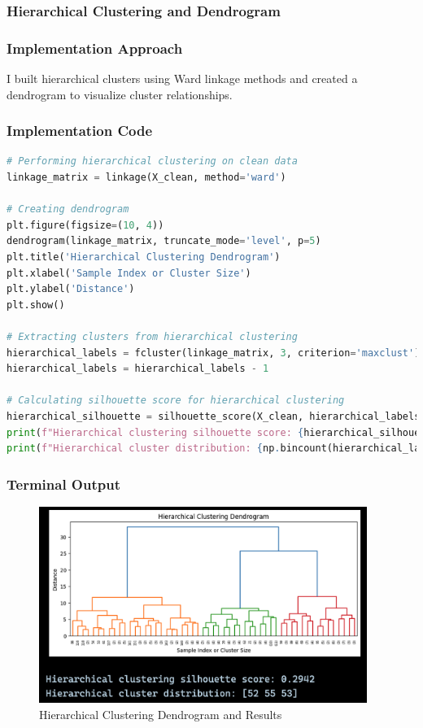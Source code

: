 \documentclass[12pt,a4paper]{article}
\begin{document}
\subsubsection{Hierarchical Clustering and Dendrogram}

\subsubsection{Implementation Approach}
I built hierarchical clusters using Ward linkage methods and created a dendrogram to visualize cluster relationships.

\subsubsection{Implementation Code}
\begin{lstlisting}[language=Python, caption=Hierarchical Clustering Implementation]
# Performing hierarchical clustering on clean data
linkage_matrix = linkage(X_clean, method='ward')

# Creating dendrogram
plt.figure(figsize=(10, 4))
dendrogram(linkage_matrix, truncate_mode='level', p=5)
plt.title('Hierarchical Clustering Dendrogram')
plt.xlabel('Sample Index or Cluster Size')
plt.ylabel('Distance')
plt.show()

# Extracting clusters from hierarchical clustering
hierarchical_labels = fcluster(linkage_matrix, 3, criterion='maxclust')
hierarchical_labels = hierarchical_labels - 1

# Calculating silhouette score for hierarchical clustering
hierarchical_silhouette = silhouette_score(X_clean, hierarchical_labels)
print(f"Hierarchical clustering silhouette score: {hierarchical_silhouette:.4f}")
print(f"Hierarchical cluster distribution: {np.bincount(hierarchical_labels)}")
\end{lstlisting}

\newpage
\subsubsection{Terminal Output}
\begin{figure}[h!]
\centering
    \includegraphics[width=0.95\textwidth]{Figures/dendrogram.png}
    \caption{Hierarchical Clustering Dendrogram and Results}
\end{figure}
\end{document}
